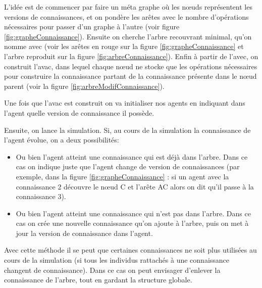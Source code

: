 \documentclass[a4paper]{article}
\begin{document}
L'idée est de commencer par faire un méta graphe où les nœuds représentent les
versions de connaissances, et on pondère les arêtes avec le nombre d'opérations
nécessaires pour passer d'un graphe à l'autre (voir figure
\ref{fig:grapheConnaissance}). Ensuite on cherche l'arbre recouvrant minimal,
qu'on nomme \gls{avec} (voir les arêtes en rouge sur la figure
\ref{fig:grapheConnaissance} et l'arbre reproduit sur la figure
\ref{fig:arbreConnaissance}). Enfin à partir de l'\gls{avec}, on construit
l'\gls{avac}, dans lequel chaque nœud ne stocke que les opérations nécessaires
pour construire la connaissance partant de la connaissance présente dans le nœud
parent (voir la figure \ref{fig:arbreModifConnaissance}).

Une fois que l'\gls{avac} est construit on va initialiser nos agents en
indiquant dans l'agent quelle version de connaissance il possède.

Ensuite, on lance la simulation. Si, au cours de la simulation la connaissance
de l'agent évolue, on a deux possibilités:

\begin{itemize}

  \item Ou bien l'agent atteint une connaissance qui est déjà dans l'arbre. Dans
    ce cas on indique juste que l'agent change de version de connaissances (par
    exemple, dans la figure \ref{fig:grapheConnaissance} : si un agent avec la
    connaissance 2 découvre le nœud C et l'arête AC alors on dit qu'il passe à
    la connaissance 3).

  \item Ou bien l'agent atteint une connaissance qui n'est pas dans l'arbre.
    Dans ce cas on crée une nouvelle connaissance qu'on ajoute à l'arbre, puis
    on met à jour la version de connaissance dans l'agent.

\end{itemize}

Avec cette méthode il se peut que certaines connaissances ne soit plus utilisées
au cours de la simulation (si tous les individus rattachés à une connaissance
changent de connaissance). Dans ce cas on peut envisager d'enlever la
connaissance de l'arbre, tout en gardant la structure globale.
\end{document}
